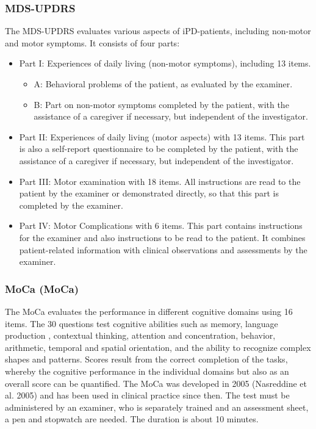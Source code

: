 \subsubsection{\acl{MDS-UPDRS}}
The \ac{MDS-UPDRS} evaluates various aspects of \ac{iPD}-patients, including non-motor and motor symptoms. It consists of four parts:
\begin{itemize}
\item Part I: Experiences of daily living (non-motor symptoms), including 13 items.
\begin{itemize}
\item A: Behavioral problems of the patient, as evaluated by the examiner.
\item B: Part on non-motor symptoms completed by the patient, with the assistance of a caregiver if necessary, but independent of the investigator.
\end{itemize}
\item Part II: Experiences of daily living (motor aspects) with 13 items. This part is also a self-report questionnaire to be completed by the patient, with the assistance of a caregiver if necessary, but independent of the investigator.
\item Part III: Motor examination with 18 items. All instructions are read to the patient by the examiner or demonstrated directly, so that this part is completed by the examiner.
\item Part IV: Motor Complications with 6 items. This part contains instructions for the examiner and also instructions to be read to the patient. It combines patient-related information with clinical observations and assessments by the examiner.
\end{itemize}

\subsubsection{\acl{MoCa} (\acs{MoCa})}
The \acl{MoCa} evaluates the performance in different cognitive domains using 16 items. The 30 questions test cognitive abilities such as memory, language production , contextual thinking, attention and concentration, behavior, arithmetic, temporal and spatial orientation, and the ability to recognize complex shapes and patterns. Scores result from the correct completion of the tasks, whereby the cognitive performance in the individual domains but also as an overall score can be quantified. The \ac{MoCa} was developed in 2005 (Nasreddine et al. 2005) and has been used in clinical practice since then. The test must be administered by an examiner, who is separately trained and an assessment sheet, a pen and stopwatch are needed. The duration is about 10 minutes.

